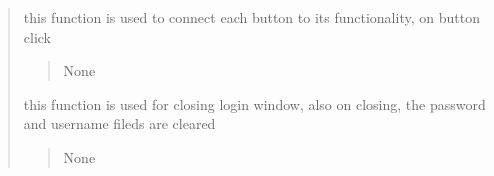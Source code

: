 \documentclass[letterpaper,10pt,english]{sphinxmanual}
\begin{document}
\begin{quote}
\begin{savenotes}
\begin{fulllineitems}
\begin{savenotes}
\begin{fulllineitems}
\begin{quote}
\begin{description}
\end{description}\end{quote}

\end{fulllineitems}\end{savenotes}


\begin{savenotes}\begin{fulllineitems}
\label{\detokenize{setting/login_UI:oxin.login_UI.UI_main_window.buttonClick}}
\pysigstartsignatures
{}
\pysigstopsignatures
\sphinxAtStartPar
this function is used to connect each button to its functionality, on button click
\begin{quote}\begin{description}
\sphinxAtStartPar
None

\end{description}\end{quote}

\end{fulllineitems}\end{savenotes}


\begin{savenotes}\begin{fulllineitems}
\label{\detokenize{setting/login_UI:oxin.login_UI.UI_main_window.close_win}}
\pysigstartsignatures
{}
\pysigstopsignatures
\sphinxAtStartPar
this function is used for closing login window, also on closing, the password and username fileds are cleared
\begin{quote}\begin{description}
\sphinxAtStartPar
None

\end{description}\end{quote}

\end{fulllineitems}\end{savenotes}



\end{fulllineitems}
\end{savenotes}
\end{quote}
\end{document}
